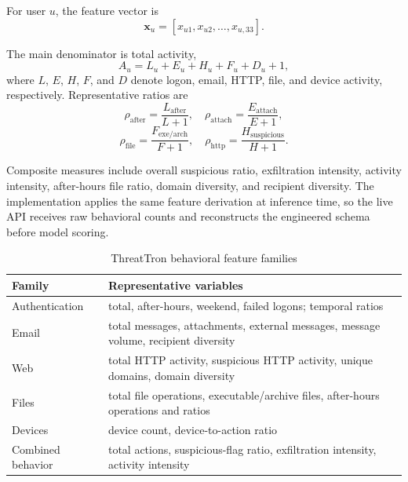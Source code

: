 For user $u$, the feature vector is
\begin{equation}
\mathbf{x}_u = [x_{u1},x_{u2},\ldots,x_{u,33}].
\end{equation}

The main denominator is total activity,
\begin{equation}
A_u = L_u+E_u+H_u+F_u+D_u+1,
\end{equation}
where $L$, $E$, $H$, $F$, and $D$ denote logon, email, HTTP, file, and device activity, respectively. Representative ratios are
\begin{equation}
\rho_{\mathrm{after}}=\frac{L_{\mathrm{after}}}{L+1},\quad
\rho_{\mathrm{attach}}=\frac{E_{\mathrm{attach}}}{E+1},
\end{equation}
\begin{equation}
\rho_{\mathrm{file}}=\frac{F_{\mathrm{exe/arch}}}{F+1},\quad
\rho_{\mathrm{http}}=\frac{H_{\mathrm{suspicious}}}{H+1}.
\end{equation}

Composite measures include overall suspicious ratio, exfiltration intensity, activity intensity, after-hours file ratio, domain diversity, and recipient diversity. The implementation applies the same feature derivation at inference time, so the live API receives raw behavioral counts and reconstructs the engineered schema before model scoring.

\begin{table}[t]
\caption{ThreatTron behavioral feature families}
\label{tab:features}
\centering
\footnotesize
\begin{tabular}{p{}p{}}
\toprule
Family & Representative variables \\
\midrule
Authentication & total, after-hours, weekend, failed logons; temporal ratios \\
Email & total messages, attachments, external messages, message volume, recipient diversity \\
Web & total HTTP activity, suspicious HTTP activity, unique domains, domain diversity \\
Files & total file operations, executable/archive files, after-hours operations and ratios \\
Devices & device count, device-to-action ratio \\
Combined behavior & total actions, suspicious-flag ratio, exfiltration intensity, activity intensity \\
\bottomrule
\end{tabular}
\end{table}


